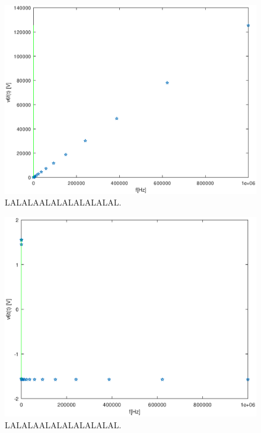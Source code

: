 \begin{figure}[h!] \centering
\includegraphics[width=0.8\linewidth]{magnitude.eps}
\caption{LALALAALALALALALALAL.}
\label{fig:LALALAAL}
\end{figure}

\begin{figure}[h!] \centering
\includegraphics[width=0.8\linewidth]{phase.eps}
\caption{LALALAALALALALALALAL.}
\label{fig:LALALAAL}
\end{figure}
